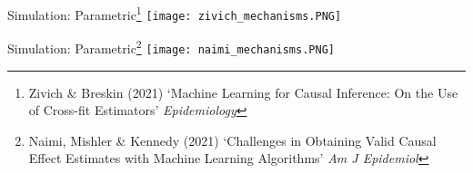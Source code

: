 \documentclass{beamer}
\begin{document}

\begin{frame}{Simulation: Parametric\footnote[frame]{Zivich \& Breskin (2021) `Machine Learning for Causal Inference: On the Use of Cross-fit Estimators' \textit{Epidemiology}}}
	\centering
	\texttt{[image: zivich\_mechanisms.PNG]}
\end{frame}

\begin{frame}{Simulation: Parametric\footnote[frame]{Naimi, Mishler \& Kennedy (2021) `Challenges in Obtaining Valid Causal Effect Estimates with Machine Learning Algorithms' \textit{Am J Epidemiol}}}
	\centering
	\texttt{[image: naimi\_mechanisms.PNG]}
\end{frame}
\end{document}
